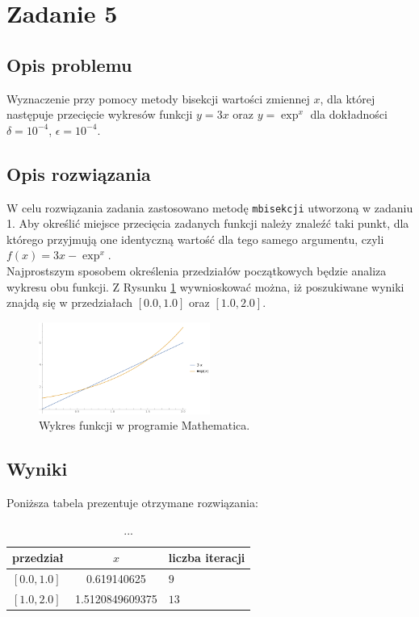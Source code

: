 \documentclass{classrep}
\begin{document}
\section{Zadanie 5}
	\subsection{Opis problemu}
		Wyznaczenie przy pomocy metody bisekcji wartości zmiennej $x$, dla której następuje przecięcie wykresów funkcji $y=3x$ oraz $y=\exp^x$ dla dokładności $\delta=10^{-4}$, $\epsilon=10^{-4}$.
	
	\subsection{Opis rozwiązania}
		W celu rozwiązania zadania zastosowano metodę \texttt{mbisekcji} utworzoną w zadaniu 1.
		Aby określić miejsce przecięcia zadanych funkcji należy znaleźć taki punkt, dla którego przyjmują one identyczną wartość dla tego samego argumentu, czyli $f(x)=3x-\exp^x$. 	\\
		 Najprostszym sposobem określenia przedziałów początkowych będzie analiza wykresu obu funkcji. Z Rysunku \ref{fig:1} wywnioskować można, iż poszukiwane wyniki znajdą się w przedziałach $[0.0,1.0]$ oraz $[1.0,2.0]$.
		
		\begin{figure}[!htbp]
			\centering
			\includegraphics[width=0.5\textwidth]{zadania/plot51.png}
  			\caption{Wykres funkcji w programie Mathematica.}
  			\label{fig:1}
		\end{figure}	
		
	\subsection{Wyniki}
		Poniższa tabela prezentuje otrzymane rozwiązania:
		\begin{table}[!hpbt]
        		\centering
        		\footnotesize
			\begin{tabular}{lSl} \toprule
				{przedział} & {$x$} & {liczba iteracji}\\ \midrule
				$[0.0,1.0]$ & 0.619140625 & $9$ \\ 
	 			$[1.0,2.0]$ & 1.5120849609375 & $13$ \\ \bottomrule
	 		\end{tabular}
	 		\caption{...}
			\label{table:2}
		\end{table}	
		
\end{document}
